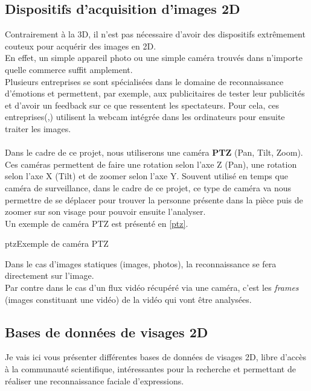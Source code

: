\documentclass[overfullbox, poster]{polytech/polytech}
\begin{document}
\subsection{Dispositifs d'acquisition d'images 2D}
Contrairement à la 3D, il n'est pas nécessaire d'avoir des dispositifs extrêmement couteux pour acquérir des images en 2D.\\
En effet, un simple appareil photo ou une simple caméra trouvés dans n'importe quelle commerce suffit amplement.\\
Plusieurs entreprises se sont spécialisées dans le domaine de reconnaissance d'émotions et permettent, par exemple, aux publicitaires de tester leur publicités et d'avoir un feedback sur ce que ressentent les spectateurs. Pour cela, ces entreprises(\cite{emotient},\cite{affectiva}) utilisent la webcam intégrée dans les ordinateurs pour ensuite traiter les images.\\
\\
Dans le cadre de ce projet, nous utiliserons une caméra \textbf{PTZ} (Pan, Tilt, Zoom). Ces caméras permettent de faire une rotation selon l'axe Z (Pan), une rotation selon l'axe X (Tilt) et de zoomer selon l'axe Y. Souvent utilisé en temps que caméra de surveillance, dans le cadre de ce projet, ce type de caméra va nous permettre de se déplacer pour trouver la personne présente dans la pièce puis de zoomer sur son visage pour pouvoir ensuite l'analyser.\\
Un exemple de caméra PTZ est présenté en \autoref{ptz}.

\begin{Figure}{ptz}{Exemple de caméra PTZ}
\end{Figure}

Dans le cas d'images statiques (images, photos), la reconnaissance se fera directement sur l'image.\\
Par contre dans le cas d'un flux vidéo récupéré via une caméra, c'est les \textit{frames} (images constituant une vidéo) de la vidéo qui vont être analysées.

\newpage
\subsection{Bases de données de visages 2D}
Je vais ici vous présenter différentes bases de données de visages 2D, libre d'accès à la communauté scientifique, intéressantes pour la recherche et permettant de réaliser une reconnaissance faciale d'expressions.
\end{document}
